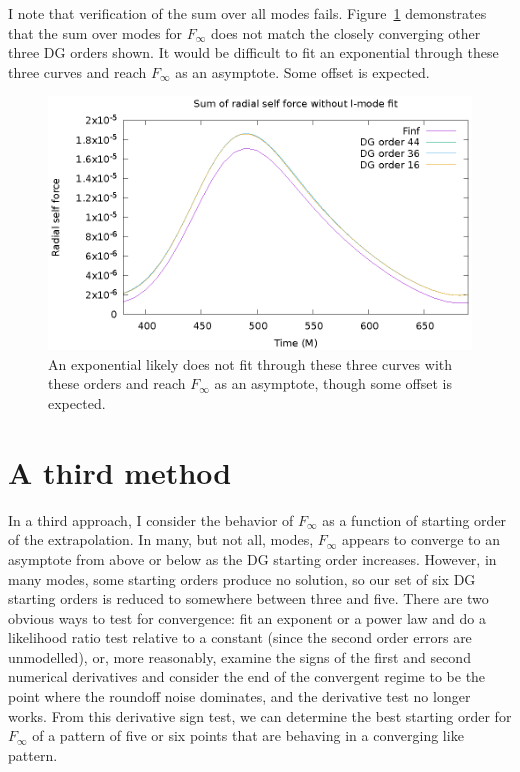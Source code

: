 I note that verification of the sum over all modes fails. Figure~\ref{unextrapsumcompareDG} demonstrates that the sum over modes for $F_\infty$ does not match the closely converging other three DG orders shown. It would be difficult to fit an exponential through these three curves and reach $F_\infty$ as an asymptote. Some offset is expected. 

\begin{figure}
\includegraphics{unextrapsumcompareDG}
\caption{An exponential likely does not fit through these three curves with these orders and reach $F_\infty$ as an asymptote, though some offset is expected.}
\label{unextrapsumcompareDG}
\end{figure}

\section{A third method}

In a third approach, I consider the behavior of $F_\infty$ as a function of starting order of the extrapolation. In many, but not all, modes, $F_\infty$ appears to converge to an asymptote from above or below as the DG starting order increases. However, in many modes, some starting orders produce no solution, so our set of six DG starting orders is reduced to somewhere between three and five. There are two obvious ways to test for convergence: fit an exponent or a power law and do a likelihood ratio test relative to a constant (since the second order errors are unmodelled), or, more reasonably, examine the signs of the first and second numerical derivatives and consider the end of the convergent regime to be the point where the roundoff noise dominates, and the derivative test no longer works. From this derivative sign test, we can determine the best starting order for $F_\infty$ of a pattern of five or six points that are behaving in a converging like pattern.

